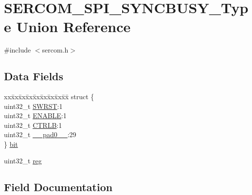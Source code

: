 \hypertarget{union_s_e_r_c_o_m___s_p_i___s_y_n_c_b_u_s_y___type}{}\section{S\+E\+R\+C\+O\+M\+\_\+\+S\+P\+I\+\_\+\+S\+Y\+N\+C\+B\+U\+S\+Y\+\_\+\+Type Union Reference}
\label{union_s_e_r_c_o_m___s_p_i___s_y_n_c_b_u_s_y___type}


{\ttfamily \#include $<$sercom.\+h$>$}

\subsection*{Data Fields}
\begin{DoxyCompactItemize}
\item 
\begin{tabbing}
xx\=xx\=xx\=xx\=xx\=xx\=xx\=xx\=xx\=\kill
struct \{\\
\>uint32\_t \mbox{\hyperlink{union_s_e_r_c_o_m___s_p_i___s_y_n_c_b_u_s_y___type_a34cd956a8da179cbd5fc9060306d420e}{SWRST}}:1\\
\>uint32\_t \mbox{\hyperlink{union_s_e_r_c_o_m___s_p_i___s_y_n_c_b_u_s_y___type_a66f979832c85e0692bd9422b05aff1f7}{ENABLE}}:1\\
\>uint32\_t \mbox{\hyperlink{union_s_e_r_c_o_m___s_p_i___s_y_n_c_b_u_s_y___type_a0ac0bbc2a904755b6f260b002320735a}{CTRLB}}:1\\
\>uint32\_t \mbox{\hyperlink{union_s_e_r_c_o_m___s_p_i___s_y_n_c_b_u_s_y___type_a3e57c2ef1c3ffb36722f000cc1156824}{\_\_pad0\_\_}}:29\\
\} \mbox{\hyperlink{union_s_e_r_c_o_m___s_p_i___s_y_n_c_b_u_s_y___type_a8484777946ea34f16e1f65c23d342af7}{bit}}\\

\end{tabbing}\item 
uint32\+\_\+t \mbox{\hyperlink{union_s_e_r_c_o_m___s_p_i___s_y_n_c_b_u_s_y___type_a6b91636401516a477989a336376d7b40}{reg}}
\end{DoxyCompactItemize}


\subsection{Field Documentation}
\mbox{\label{union_s_e_r_c_o_m___s_p_i___s_y_n_c_b_u_s_y___type_a3e57c2ef1c3ffb36722f000cc1156824}} 
